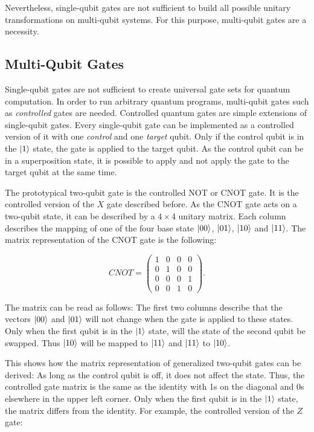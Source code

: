 Nevertheless, single-qubit gates are not sufficient to build all possible unitary transformations on multi-qubit systems. 
For this purpose, multi-qubit gates are a necessity.

\subsection{Multi-Qubit Gates}

Single-qubit gates are not sufficient to create universal gate sets for quantum
computation. In order to run arbitrary quantum programs, multi-qubit gates such as
 \textit{controlled} gates are needed.
Controlled quantum gates are simple extensions of single-qubit gates. Every single-qubit gate can be implemented as a controlled 
version of it with one \textit{control} and one \textit{target} qubit. Only if
the control qubit is in the $\Ket{1}$ state, the gate is applied to the target
qubit. As the control qubit can be in a superposition state, it is possible to apply and not apply the gate to the target qubit at the same time.

The prototypical two-qubit gate is the controlled NOT or CNOT gate. It is the controlled version of the 
$X$ gate described before. As the CNOT gate acts on a two-qubit state, it can be described by 
a $4 \times 4$ unitary matrix. Each column describes the mapping of one of the four base
state $\Ket{00}$, $\Ket{01}$, $\Ket{10}$ and $\Ket{11}$. 
The matrix representation of the CNOT gate is the following:

\begin{equation}
  CNOT = \begin{pmatrix}
    1 & 0 & 0 & 0 \\
    0 & 1 & 0 & 0 \\
    0 & 0 & 0 & 1 \\
    0 & 0 & 1 & 0
    \end{pmatrix}.
\end{equation}

The matrix can be read as follows: The first two columns describe that the vectors $\Ket{00}$ and $\Ket{01}$ will not change when the gate is applied to these states. Only when the first qubit is in the $\Ket{1}$ state, will the state of the second qubit be swapped. Thus $\Ket{10}$ will be mapped to $\Ket{11}$ and $\Ket{11}$ to $\Ket{10}$. 

This shows how the matrix representation of generalized two-qubit gates can be derived: As long as the control qubit is off, it does not affect the state. Thus, the controlled gate matrix is the same as the identity with 1s on the diagonal and 0s elsewhere in the upper left corner. Only when the first qubit is in the $\Ket{1}$ state, the matrix differs from the identity. For example, the 
controlled version of the $Z$ gate:

